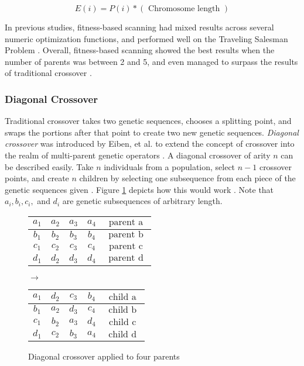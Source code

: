\[ E(i) = P(i) *(\text{ Chromosome length }) \]

In previous studies, fitness-based scanning had mixed results across several numeric optimization functions, and performed well on the Traveling Salesman Problem \cite{Eiben94, Eiben95}. Overall, fitness-based scanning showed the best results when the number of parents was between 2 and 5, and even managed to surpass the results of traditional crossover \cite{Eiben94}. 

\subsubsection*{Diagonal Crossover}
Traditional crossover takes two genetic sequences, chooses a splitting point, and swaps the portions after that point to create two new genetic sequences. \emph{Diagonal crossover} was introduced by Eiben, et al. to extend the concept of crossover into the realm of multi-parent genetic operators \cite{Eiben03}. A diagonal crossover of arity $n$ can be described easily. Take $n$ individuals from a population, select $n-1$ crossover points, and create $n$ children by selecting one subsequence from each piece of the genetic sequences given \cite{Eiben95}. Figure \ref{DC-Fig} depicts how this would work \cite{Eiben95}. Note that $a_i, b_i, c_i,$ and $d_i$ are genetic subsequences of arbitrary length.
\begin{figure}[h!]
\centering
\begin{tabular}{ | c | c | c | c | c | }
\hline
{\color{myred}$a_1$} & {\color{myred}$a_2$} & {\color{myred}$a_3$} & {\color{myred}$a_4$} & $\text{ parent a }$ 	\\ \hline
{\color{myblue}$b_1$} & {\color{myblue}$b_2$} & {\color{myblue}$b_3$} & {\color{myblue}$b_4$} & $\text{ parent b }$ 	\\ \hline
{\color{mygreen}$c_1$} & {\color{mygreen}$c_2$} & {\color{mygreen}$c_3$} & {\color{mygreen}$c_4$} & $\text{ parent c }$ 	\\ \hline
$d_1$ & $d_2$ & $d_3$ & $d_4$ & $\text{ parent d }$ 	\\ \hline
\end{tabular}
$\rightarrow$
\begin{tabular}{ | c | c | c | c | c | }
\hline
{\color{myred}$a_1$} & $d_2$ & {\color{mygreen}$c_3$} & {\color{myblue}$b_4$} & $\text{ child a }$ 	\\ \hline
{\color{myblue}$b_1$} & {\color{myred}$a_2$} & $d_3$ & {\color{mygreen}$c_4$} & $\text{ child b }$ 	\\ \hline
{\color{mygreen}$c_1$} & {\color{myblue}$b_2$} & {\color{myred}$a_3$} & $d_4$ & $\text{ child c }$ 	\\ \hline
$d_1$ & {\color{mygreen}$c_2$} & {\color{myblue}$b_3$} & {\color{myred}$a_4$} & $\text{ child d }$ 	\\ \hline
\end{tabular}
\caption{Diagonal crossover applied to four parents}
\label{DC-Fig}
\end{figure} 


